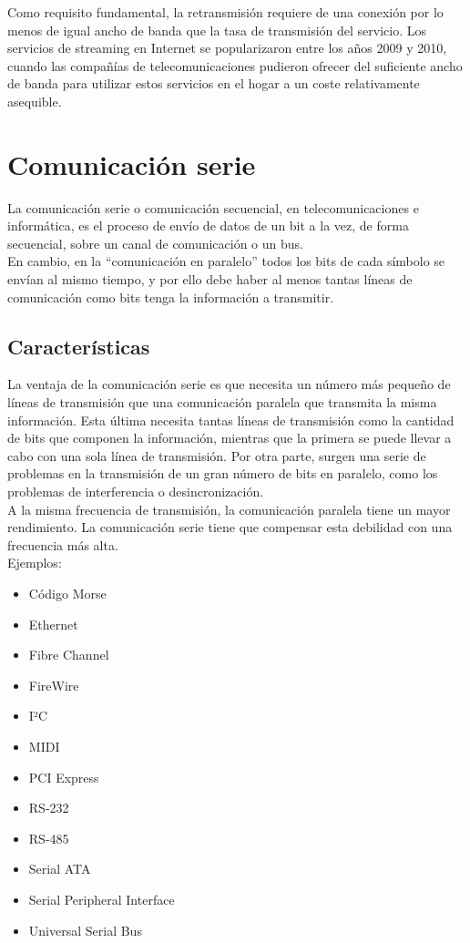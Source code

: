 Como requisito fundamental, la retransmisión requiere de una conexión por lo menos de igual ancho de banda que la tasa de transmisión del servicio. Los servicios de streaming en 
Internet se popularizaron entre los años 2009 y 2010, cuando las compañías de telecomunicaciones pudieron ofrecer del suficiente ancho de banda para utilizar estos servicios
en el hogar a un coste relativamente asequible.

\section{Comunicación serie}

La comunicación serie o comunicación secuencial, en telecomunicaciones e informática, es el proceso de envío de datos de un bit a la vez, de forma secuencial, sobre un canal
de comunicación o un bus.\\

En cambio, en la “comunicación en paralelo” todos los bits de cada símbolo se envían al mismo tiempo, y por ello debe haber al menos tantas líneas de comunicación como bits tenga
la información a transmitir.\\

\subsection{Características}

La ventaja de la comunicación serie es que necesita un número más pequeño de líneas de transmisión que una comunicación paralela que transmita la misma información. Esta última
necesita tantas líneas de transmisión como la cantidad de bits que componen la información, mientras que la primera se puede llevar a cabo con una sola línea de transmisión. Por otra parte,
surgen una serie de problemas en la transmisión de un gran número de bits en paralelo, como los problemas de interferencia o desincronización.\\

A la misma frecuencia de transmisión, la comunicación paralela tiene un mayor rendimiento. La comunicación serie tiene que compensar esta debilidad con una frecuencia más alta.\\

Ejemplos:\\

\begin{itemize}
 \item Código Morse
 \item Ethernet
 \item Fibre Channel
 \item FireWire
 \item I²C
 \item MIDI
 \item PCI Express
 \item RS-232
 \item RS-485
 \item Serial ATA
 \item Serial Peripheral Interface
 \item Universal Serial Bus
\end{itemize}


